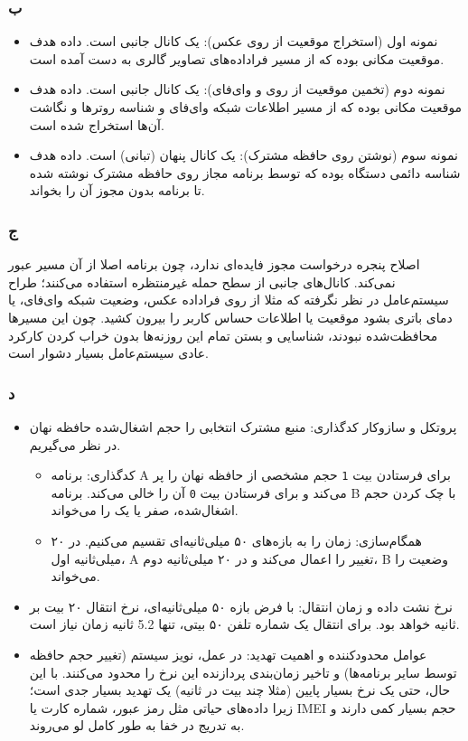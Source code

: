 \subsubsection*{ب}
\begin{itemize}
    \item {نمونه اول (استخراج موقعیت از روی  عکس):} یک {کانال جانبی} است. داده هدف موقعیت مکانی بوده که از مسیر فراداده‌های تصاویر گالری به دست آمده است.
    \item {نمونه دوم (تخمین موقعیت از روی  و وای‌فای):} یک {کانال جانبی} است. داده هدف موقعیت مکانی بوده که از مسیر اطلاعات شبکه وای‌فای و شناسه روترها و نگاشت آن‌ها استخراج شده است.
    \item {نمونه سوم (نوشتن  روی حافظه مشترک):} یک {کانال پنهان} (تبانی) است. داده هدف شناسه دائمی دستگاه بوده که توسط برنامه مجاز روی حافظه مشترک نوشته شده تا برنامه بدون مجوز آن را بخواند.
\end{itemize}

\subsubsection*{ج}
اصلاح پنجره درخواست مجوز فایده‌ای ندارد، چون برنامه اصلا از آن مسیر عبور نمی‌کند. کانال‌های جانبی از {سطح حمله غیرمنتظره} استفاده می‌کنند؛ طراح سیستم‌عامل در نظر نگرفته که مثلا از روی فراداده عکس، وضعیت شبکه وای‌فای، یا دمای باتری بشود موقعیت یا اطلاعات حساس کاربر را بیرون کشید. چون این مسیرها محافظت‌شده نبودند، شناسایی و بستن تمام این روزنه‌ها بدون خراب کردن کارکرد عادی سیستم‌عامل بسیار دشوار است.

\subsubsection*{د}
\begin{itemize}
    \item {پروتکل و سازوکار کدگذاری:} منبع مشترک انتخابی را حجم اشغال‌شده حافظه نهان در نظر می‌گیریم.
    \begin{itemize}
        \item {کدگذاری:} برنامه A برای فرستادن بیت \texttt{1} حجم مشخصی از حافظه نهان را پر می‌کند و برای فرستادن بیت \texttt{0} آن را خالی می‌کند. برنامه B با چک کردن حجم اشغال‌شده، صفر یا یک را می‌خواند.
        \item {همگام‌سازی:} زمان را به بازه‌های ۵۰ میلی‌ثانیه‌ای تقسیم می‌کنیم. در ۲۰ میلی‌ثانیه اول، A تغییر را اعمال می‌کند و در ۲۰ میلی‌ثانیه دوم، B وضعیت را می‌خواند.
    \end{itemize}
    \item {نرخ نشت داده و زمان انتقال:} با فرض بازه ۵۰ میلی‌ثانیه‌ای، نرخ انتقال {۲۰ بیت بر ثانیه} خواهد بود. برای انتقال یک شماره تلفن ۵۰ بیتی، تنها {{5.2} ثانیه} زمان نیاز است.
    \item {عوامل محدودکننده و اهمیت تهدید:} در عمل، نویز سیستم (تغییر حجم حافظه توسط سایر برنامه‌ها) و تاخیر زمان‌بندی پردازنده این نرخ را محدود می‌کنند. با این حال، حتی یک نرخ بسیار پایین (مثلا چند بیت در ثانیه) یک تهدید بسیار جدی است؛ زیرا داده‌های حیاتی مثل رمز عبور، شماره کارت یا IMEI حجم بسیار کمی دارند و به تدریج در خفا به طور کامل لو می‌روند.
\end{itemize}
